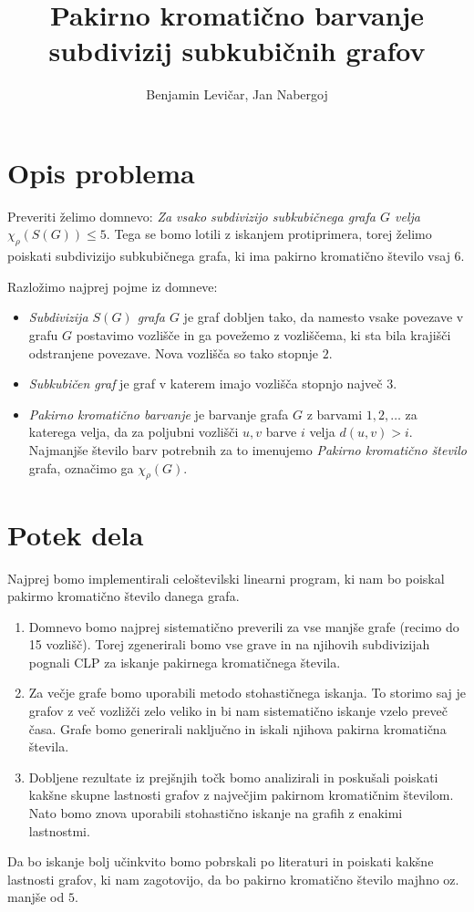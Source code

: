 \documentclass[11pt,a4paper]{article}
\begin{document}
\title{Pakirno kromatično barvanje subdivizij subkubičnih grafov}
\author{Benjamin Levičar, Jan Nabergoj}

\maketitle

\section{Opis problema}

Preveriti  želimo domnevo: \emph{Za vsako subdivizijo subkubičnega grafa $G$ velja $\chi_\rho(S(G)) \leq 5$}. Tega se bomo lotili z iskanjem protiprimera, torej želimo poiskati subdivizijo subkubičnega grafa, ki ima pakirno kromatično število vsaj 6.

Razložimo najprej pojme iz domneve:
\begin{itemize}
    \item \emph{Subdivizija $S(G)$ grafa $G$} je graf dobljen tako, da namesto vsake povezave v grafu $G$ postavimo vozlišče in ga povežemo z vozliščema,
          ki sta bila krajišči odstranjene povezave. Nova vozlišča so tako stopnje $2$.
    \item \emph{Subkubičen graf} je graf v katerem imajo vozlišča stopnjo največ $3$.
    \item \emph{Pakirno kromatično barvanje} je barvanje grafa $G$ z barvami $1, 2, \dots$ za katerega velja, da za poljubni vozlišči $u, v$ barve $i$ velja $d(u, v) > i$.
          Najmanjše število barv potrebnih za to imenujemo \emph{Pakirno kromatično število} grafa, označimo ga $\chi_\rho(G)$.
\end{itemize}


\section{Potek dela}

Najprej bomo implementirali celoštevilski linearni program, ki nam bo poiskal pakirmo kromatično število danega grafa. 

\begin{enumerate}
    \item Domnevo bomo najprej sistematično preverili za vse manjše grafe (recimo do 15 vozlišč). Torej zgenerirali bomo vse grave in na njihovih subdivizijah pognali CLP za iskanje pakirnega kromatičnega števila.
    \item Za večje grafe bomo uporabili metodo stohastičnega iskanja. To storimo saj je grafov z več vozližči zelo veliko in bi nam sistematično iskanje vzelo preveč časa. Grafe bomo generirali naključno in iskali njihova pakirna kromatična števila.
    \item Dobljene rezultate iz prejšnjih točk bomo analizirali in poskušali poiskati kakšne skupne lastnosti grafov z največjim pakirnom kromatičnim številom. Nato bomo znova uporabili stohastično iskanje na grafih z enakimi lastnostmi.
\end{enumerate}

Da bo iskanje bolj učinkvito bomo pobrskali po literaturi in poiskati kakšne lastnosti grafov, ki nam zagotovijo, da bo pakirno kromatično število majhno
oz. manjše od $5$.
\end{document}
